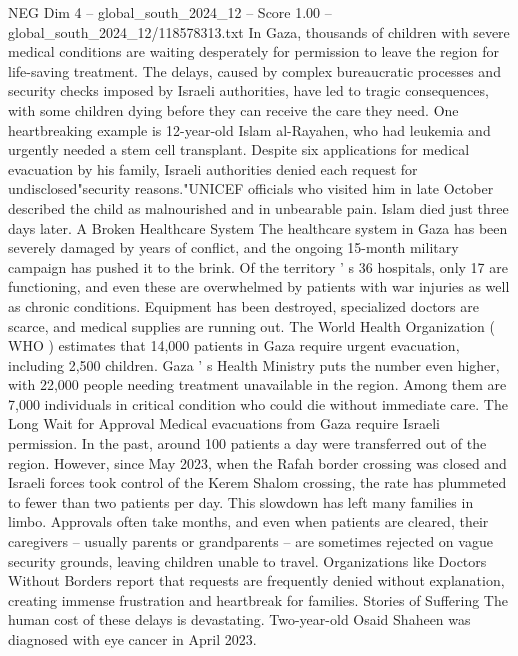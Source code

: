 \begin{textsample}{NEG Dim 4 – global\_south\_2024\_12 – Score 1.00 – global\_south\_2024\_12/118578313.txt}  \label{ex:f4_neg_210}
In Gaza, thousands of children with severe medical conditions are waiting desperately for permission to leave the region for life-saving treatment.
The delays, caused by complex bureaucratic processes and security checks imposed by Israeli authorities, have led to tragic consequences, with some children dying before they can receive the care they need.
One heartbreaking example is 12-year-old Islam al-Rayahen, who had leukemia and urgently needed a stem cell transplant.
Despite six applications for medical evacuation by his family, Israeli authorities denied each request for undisclosed"security reasons."UNICEF officials who visited him in late October described the child as malnourished and in unbearable pain.
Islam died just three days later.
A Broken Healthcare System The healthcare system in Gaza has been severely damaged by years of conflict, and the ongoing 15-month military campaign has pushed it to the brink.
Of the territory ' s 36 hospitals, only 17 are functioning, and even these are overwhelmed by patients with war injuries as well as chronic conditions.
Equipment has been destroyed, specialized doctors are scarce, and medical supplies are running out.
The World Health Organization ( WHO ) estimates that 14,000 patients in Gaza require urgent evacuation, including 2,500 children.
Gaza ' s Health Ministry puts the number even higher, with 22,000 people needing treatment unavailable in the region.
Among them are 7,000 individuals in critical condition who could die without immediate care.
The Long Wait for Approval Medical evacuations from Gaza require Israeli permission.
In the past, around 100 patients a day were transferred out of the region.
However, since May 2023, when the Rafah border crossing was closed and Israeli forces took control of the Kerem Shalom crossing, the rate has plummeted to fewer than two patients per day.
This slowdown has left many families in limbo.
Approvals often take months, and even when patients are cleared, their caregivers -- usually parents or grandparents -- are sometimes rejected on vague security grounds, leaving children unable to travel.
Organizations like Doctors Without Borders report that requests are frequently denied without explanation, creating immense frustration and heartbreak for families.
Stories of Suffering The human cost of these delays is devastating.
Two-year-old Osaid Shaheen was diagnosed with eye cancer in April 2023.

\end{textsample}
